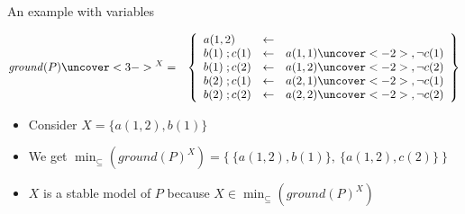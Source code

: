 \begin{frame}{An example with variables}

  \begin{eqnarray*}
    \mathit{ground}(P)\uncover<3->{^X}
    &=&
    \left\{
    \begin{array}{lcl}
      a(1,2)      & \leftarrow &
      \\
      b(1)\;;c(1) & \leftarrow & a(1,1)\uncover<-2>{, {\neg c(1)}}
      \\
      b(1)\;;c(2) & \leftarrow & a(1,2)\uncover<-2>{, {\neg c(2)}}
      \\
      b(2)\;;c(1) & \leftarrow & a(2,1)\uncover<-2>{, {\neg c(1)}}
      \\
      b(2)\;;c(2) & \leftarrow & a(2,2)\uncover<-2>{, {\neg c(2)}}
    \end{array}
    \right\}
  \end{eqnarray*}

  \begin{itemize}
    \item<2->
          Consider $X=\{a(1,2),  b(1)\}$
    \item <4->
          We get
          \(
          \min_\subseteq(\mathit{ground}(P)^X)
          =
          \{\ \{a(1,2),  b(1)\},\ \{a(1,2),  c(2)\}\ \}
          \)
    \item<5->
          $X$ is a  stable model of $P$ because
          \(
          X\in\min_\subseteq(\mathit{ground}(P)^X)
          \)
  \end{itemize}
\end{frame}
